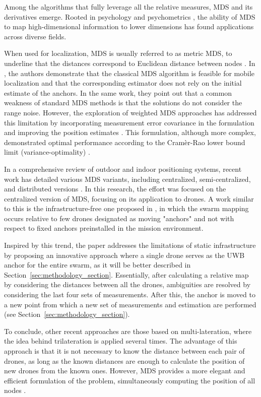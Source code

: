 Among the algorithms that fully leverage all the relative measures, MDS and its derivatives emerge. 
Rooted in psychology and psychometrics \cite{france_two-way_2011, young_discussion_1938, torgerson_multidimensional_1952}, the ability of MDS to map high-dimensional information to lower dimensions has found applications across diverse fields.

When used for localization, MDS is usually referred to as metric MDS, to underline that the distances correspond to Euclidean distance between nodes \cite{saeed_state---art_2019}.
In \cite{zhang-xin_chen_supplement_2009}, the authors demonstrate that the classical MDS algorithm is feasible for mobile localization and that the corresponding estimator does not rely on the initial estimate of the anchors. 
In the same work, they point out that a common weakness of standard MDS methods is that the solutions do not consider the range noise. However, the exploration of weighted MDS approaches has addressed this limitation by incorporating measurement error covariance in the formulation and improving the position estimates  \cite{zhang-xin_chen_supplement_2009}. 
This formulation, although more complex, demonstrated optimal performance according to the Cramèr-Rao lower bound limit (variance-optimality) \cite{zhang-xin_chen_supplement_2009}.

In a comprehensive review of outdoor and indoor positioning systems, recent work has detailed various MDS variants, including centralized, semi-centralized, and distributed versions \cite{saeed_state---art_2019}. 
In this research, the effort was focused on the centralized version of MDS, focusing on its application to drones. 
A work similar to this is the infrastructure-free one proposed in   \cite{pourjabar_land_2023}, in which the swarm mapping occurs relative to few drones designated as moving "anchors" and not with respect to fixed anchors preinstalled in the mission environment.\par

Inspired by this trend, the paper addresses the limitations of static infrastructure by proposing an innovative approach where a single drone serves as the UWB anchor for the entire swarm, as it will be better described in Section~\ref{sec:methodology_section}. 
Essentially, after calculating a relative map by considering the distances between all the drones, ambiguities are resolved by considering the last four sets of measurements. 
After this, the anchor is moved to a new point from which a new set of measurements and estimation are performed (see Section~\ref{sec:methodology_section}).

To conclude, other recent approaches are those based on multi-lateration, where the idea behind trilateration is applied several times. 
The advantage of this approach is that it is not necessary to know the distance between each pair of drones, as long as the known distances are enough to calculate the position of new drones from the known ones.
However, MDS provides a more elegant and efficient formulation of the problem, simultaneously computing the position of all nodes \cite{corbalan_self-localization_2023}.



